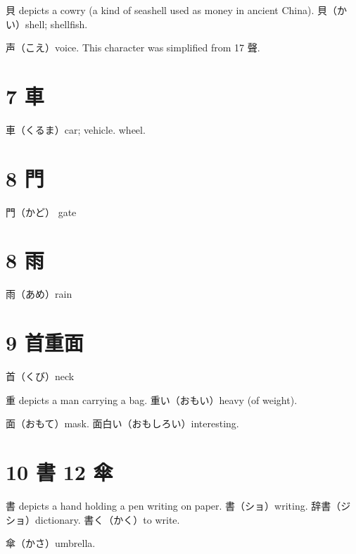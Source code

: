 貝 depicts a cowry (a kind of seashell used as money in ancient China).
貝（かい）shell; shellfish.

声（こえ）voice.
This character was simplified from 17 聲.

\section{7 車}

車（くるま）car; vehicle. wheel.

\section{8 門}

門（かど） gate

\section{8 雨}

雨（あめ）rain

\section{9 首重面}

首（くび）neck

重 depicts a man carrying a bag.
重い（おもい）heavy (of weight).

面（おもて）mask.
面白い（おもしろい）interesting.

\section{10 書 12 傘}

書 depicts a hand holding a pen writing on paper.
書（ショ）writing.
辞書（ジショ）dictionary.
書く（かく）to write.

傘（かさ）umbrella.
